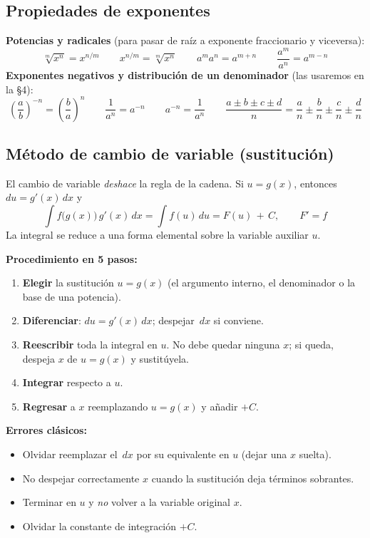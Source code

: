 \documentclass[12pt, letterpaper]{article}
\newcommand{\dx}{\,dx}
\newcommand{\du}{\,du}
\newcommand{\CC}{\,+\,C}
\begin{document}
\subsection{Propiedades de exponentes}

\begin{cuadroteoria}
\textbf{Potencias y radicales} (para pasar de raíz a exponente fraccionario y viceversa):
\[
\sqrt[m]{x^{n}} = x^{n/m}
\qquad
x^{n/m} = \sqrt[m]{x^{n}}
\qquad
a^{m}a^{n} = a^{m+n}
\qquad
\frac{a^{m}}{a^{n}} = a^{m-n}
\]
\textbf{Exponentes negativos y distribución de un denominador} (las usaremos en la §4):
\[
\left(\frac{a}{b}\right)^{-n} = \left(\frac{b}{a}\right)^{n}
\qquad
\frac{1}{a^{n}} = a^{-n}
\qquad
a^{-n} = \frac{1}{a^{n}}
\qquad
\frac{a \pm b \pm c \pm d}{n} = \frac{a}{n} \pm \frac{b}{n} \pm \frac{c}{n} \pm \frac{d}{n}
\]
\end{cuadroteoria}

\subsection{Método de cambio de variable (sustitución)}

\begin{cuadroteoria}
El cambio de variable \emph{deshace} la regla de la cadena. Si $u = g(x)$, entonces
$du = g'(x)\dx$ y
\[
\int f\bigl(g(x)\bigr)\,g'(x)\dx = \int f(u)\du = F(u) \CC,
\qquad F' = f
\]
La integral se reduce a una forma elemental sobre la variable auxiliar $u$.
\end{cuadroteoria}

\begin{cuadropasos}
\textbf{Procedimiento en 5 pasos:}
\begin{enumerate}
  \item \textbf{Elegir} la sustitución $u = g(x)$ (el argumento interno, el denominador
        o la base de una potencia).
  \item \textbf{Diferenciar}: $du = g'(x)\dx$; despejar $\dx$ si conviene.
  \item \textbf{Reescribir} toda la integral en $u$. No debe quedar ninguna $x$; si
        queda, despeja $x$ de $u = g(x)$ y sustitúyela.
  \item \textbf{Integrar} respecto a $u$.
  \item \textbf{Regresar} a $x$ reemplazando $u = g(x)$ y añadir $+C$.
\end{enumerate}
\end{cuadropasos}

\begin{cuadroadvertencia}
\textbf{Errores clásicos:}
\begin{itemize}
  \item Olvidar reemplazar el $\dx$ por su equivalente en $u$ (dejar una $x$ suelta).
  \item No despejar correctamente $x$ cuando la sustitución deja términos sobrantes.
  \item Terminar en $u$ y \emph{no} volver a la variable original $x$.
  \item Olvidar la constante de integración $+C$.
\end{itemize}
\end{cuadroadvertencia}
\end{document}
